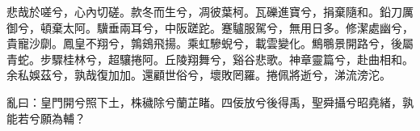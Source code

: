 
\begin{pinyinscope}
悲哉於嗟兮，心內切磋。款冬而生兮，凋彼葉柯。瓦礫進寶兮，捐棄隨和。鉛刀厲御兮，頓棄太阿。驥垂兩耳兮，中阪蹉跎。蹇驢服駕兮，無用日多。修潔處幽兮，貴寵沙劘。鳳皇不翔兮，鶉鴳飛揚。乘虹驂蜺兮，載雲變化。鷦䳟景開路兮，後屬青蛇。步驟桂林兮，超驤捲阿。丘陵翔舞兮，谿谷悲歌。神章靈篇兮，赴曲相和。余私娛茲兮，孰哉復加加。還顧世俗兮，壞敗罔羅。捲佩將逝兮，涕流滂沱。

亂曰：皇門開兮照下土，株穢除兮蘭芷睹。四佞放兮後得禹，聖舜攝兮昭堯緒，孰能若兮願為輔？


\end{pinyinscope}